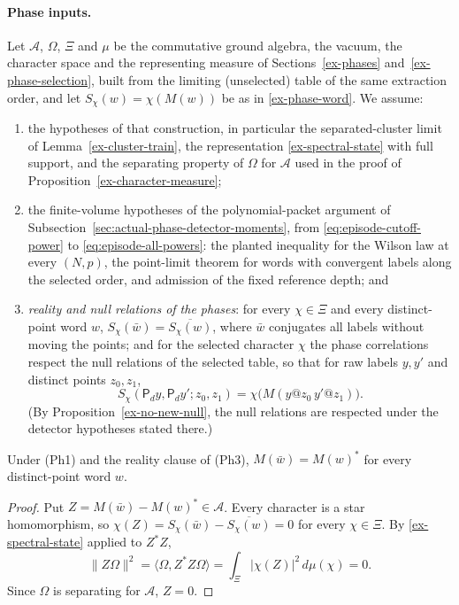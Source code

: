 \paragraph{Phase inputs.}
Let $\mathcal A$, $\Omega$, $\Xi$ and $\mu$ be the commutative ground
algebra, the vacuum, the character space and the representing measure of
Sections~\ref{ex-phases} and~\ref{ex-phase-selection}, built from the
limiting (unselected) table of the same extraction order, and let
$S_\chi(w)=\chi(M(w))$ be as in \eqref{ex-phase-word}. We assume:
\begin{enumerate}
\item[(Ph1)] the hypotheses of that construction, in particular the
 separated-cluster limit of Lemma~\ref{ex-cluster-train}, the
 representation \eqref{ex-spectral-state} with full support, and the
 separating property of $\Omega$ for $\mathcal A$ used in the proof of
 Proposition~\ref{ex-character-measure};
\item[(Ph2)] the finite-volume hypotheses of the polynomial-packet
 argument of Subsection~\ref{sec:actual-phase-detector-moments}, from
 \eqref{eq:episode-cutoff-power} to \eqref{eq:episode-all-powers}:
 the planted inequality for the Wilson law at every $(N,p)$, the
 point-limit theorem for words with convergent labels along the selected
 order, and admission of the fixed reference depth; and
\item[(Ph3)] \emph{reality and null relations of the phases}: for every
 $\chi\in\Xi$ and every distinct-point word $w$,
 $S_\chi(\bar w)=\overline{S_\chi(w)}$, where $\bar w$ conjugates all
 labels without moving the points; and for the selected character $\chi$
 the phase correlations respect the null relations of the selected
 table, so that for raw labels $y,y'$ and distinct points $z_0,z_1$,
 \[
  S_\chi(\mathsf P_dy,\mathsf P_dy';z_0,z_1)=\chi\bigl(M(y@z_0\,y'@z_1)\bigr).
 \]
 (By Proposition~\ref{ex-no-new-null}, the null relations are respected
 under the detector hypotheses stated there.)
\end{enumerate}

\begin{lemma}\label{lem:trace-rounded-conjugate}
Under (Ph1) and the reality clause of (Ph3), $M(\bar w)=M(w)^*$ for every
distinct-point word $w$.
\end{lemma}
\begin{proof}
Put $Z=M(\bar w)-M(w)^*\in\mathcal A$. Every character is a star
homomorphism, so $\chi(Z)=S_\chi(\bar w)-\overline{S_\chi(w)}=0$ for
every $\chi\in\Xi$. By \eqref{ex-spectral-state} applied to $Z^*Z$,
\[
 \|Z\Omega\|^2=\langle\Omega,Z^*Z\Omega\rangle
   =\int_\Xi|\chi(Z)|^2\,d\mu(\chi)=0 .
\]
Since $\Omega$ is separating for $\mathcal A$, $Z=0$.
\end{proof}

